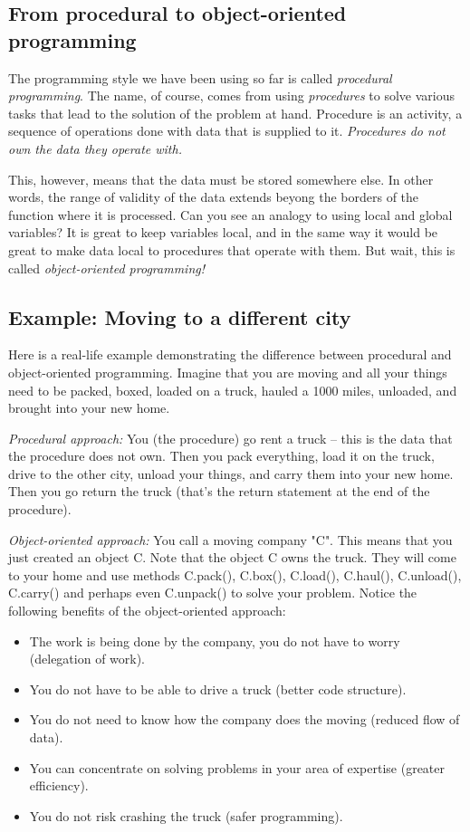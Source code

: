 \subsection{From procedural to object-oriented programming}

The programming style we have been using so far is called {\em procedural programming}.
The name, of course, comes from using {\em procedures} to solve various tasks that 
lead to the solution of the problem at hand. Procedure is an activity, a sequence of operations 
done with data that is supplied to it. {\em Procedures do not own the data they 
operate with.} 

This, however, means that the data must be stored somewhere else. In other
words, the range of validity of the data extends beyong the borders of the 
function where it is processed. 
Can you see an analogy to using local and global variables? It is great
to keep variables local, and in the same way it would be great to make
data local to procedures that operate with them. But wait, this is called {\em 
object-oriented programming!}

\subsection{Example: Moving to a different city}

Here is a real-life example demonstrating the difference between 
procedural and object-oriented programming. Imagine that you are moving 
and all your things need to be packed, boxed, loaded on a truck, hauled 
a 1000 miles, unloaded, and brought into your new home. 

{\em Procedural approach:} You (the procedure) 
go rent a truck -- this is the data that the procedure does not own. Then
you pack everything, load it on the truck, drive to the other city, 
unload your things, and carry them into your new home. Then you go 
return the truck (that's the return statement at the end of the procedure).

{\em Object-oriented approach:} You call a moving company "C". This means 
that you just created an object C. Note that the 
object C owns the truck. They will come to your home and use methods 
C.pack(), C.box(), C.load(), C.haul(), C.unload(), C.carry() and perhaps 
even C.unpack() to solve your problem. Notice the following benefits of the object-oriented approach: 
\begin{itemize}
\item The work is being done by the company, 
      you do not have to worry (delegation of work).
\item You do not have to be able to drive a truck (better code structure). 
\item You do not need to know how the company does the moving (reduced flow of data).
\item You can concentrate on solving problems 
      in your area of expertise (greater efficiency).
\item You do not risk crashing the truck (safer programming).
\end{itemize}

